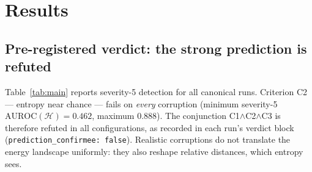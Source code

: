 \documentclass[11pt]{article}
\newcommand{\Hent}{\mathcal{H}}
\begin{document}
\section{Results}
\label{sec:results}

\subsection{Pre-registered verdict: the strong prediction is refuted}
\label{sec:verdict}

Table~\ref{tab:main} reports severity-5 detection for all canonical runs.
Criterion C2 --- entropy near chance --- fails on \emph{every} corruption
(minimum severity-5 $\mathrm{AUROC}(\Hent)=0.462$, maximum $0.888$). The
conjunction C1$\wedge$C2$\wedge$C3 is therefore refuted in all
configurations, as recorded in each run's verdict block
(\texttt{prediction\_confirmee: false}). Realistic corruptions do not
translate the energy landscape uniformly: they also reshape relative
distances, which entropy sees.
\end{document}
